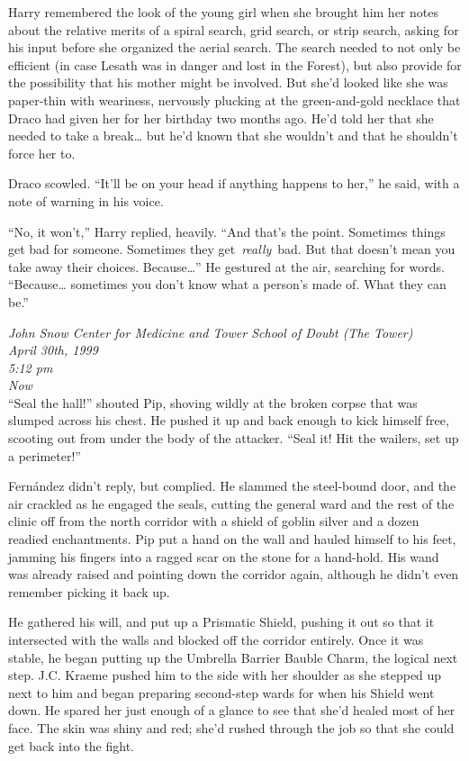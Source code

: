 Harry remembered the look of the young girl when she brought him her
notes about the relative merits of a spiral search, grid search, or
strip search, asking for his input before she organized the aerial
search. The search needed to not only be efficient (in case Lesath was
in danger and lost in the Forest), but also provide for the possibility
that his mother might be involved. But she'd looked like she was
paper-thin with weariness, nervously plucking at the green-and-gold
necklace that Draco had given her for her birthday two months ago. He'd
told her that she needed to take a break\ldots{} but he'd known that she
wouldn't and that he shouldn't force her to.

Draco scowled. ``It'll be on your head if anything happens to her,'' he
said, with a note of warning in his voice.

``No, it won't,'' Harry replied, heavily. ``And that's the point.
Sometimes things get bad for someone. Sometimes they
get~\emph{really}~bad. But that doesn't mean you take away their
choices. Because\ldots{}'' He gestured at the air, searching for words.
``Because\ldots{} sometimes you don't know what a person's made of. What
they can be.''

\mybreak

\emph{John Snow Center for Medicine and Tower School of Doubt (The
Tower)}\\
\emph{April 30th, 1999}\\
\emph{5:12 pm}\\
\emph{Now}\\

``Seal the hall!'' shouted Pip, shoving wildly at the broken corpse that
was slumped across his chest. He pushed it up and back enough to kick
himself free, scooting out from under the body of the attacker. ``Seal
it! Hit the wailers, set up a perimeter!''

Fernández didn't reply, but complied. He slammed the steel-bound door,
and the air crackled as he engaged the seals, cutting the general ward
and the rest of the clinic off from the north corridor with a shield of
goblin silver and a dozen readied enchantments. Pip put a hand on the
wall and hauled himself to his feet, jamming his fingers into a ragged
scar on the stone for a hand-hold. His wand was already raised and
pointing down the corridor again, although he didn't even remember
picking it back up.

He gathered his will, and put up a Prismatic Shield, pushing it out so
that it intersected with the walls and blocked off the corridor
entirely. Once it was stable, he began putting up the Umbrella Barrier
Bauble Charm, the logical next step. J.C. Kraeme pushed him to the side
with her shoulder as she stepped up next to him and began preparing
second-step wards for when his Shield went down. He spared her just
enough of a glance to see that she'd healed most of her face. The skin
was shiny and red; she'd rushed through the job so that she could get
back into the fight.

